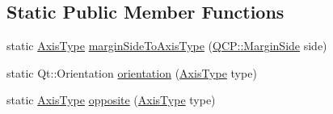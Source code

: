 \subsection*{Static Public Member Functions}
\begin{DoxyCompactItemize}
\item 
static \mbox{\hyperlink{class_q_c_p_axis_ae2bcc1728b382f10f064612b368bc18a}{Axis\+Type}} \mbox{\hyperlink{class_q_c_p_axis_ac0a6b77bd52bec6c81cd62d167cfeba6}{margin\+Side\+To\+Axis\+Type}} (\mbox{\hyperlink{namespace_q_c_p_a7e487e3e2ccb62ab7771065bab7cae54}{Q\+C\+P\+::\+Margin\+Side}} side)
\item 
static Qt\+::\+Orientation \mbox{\hyperlink{class_q_c_p_axis_a9a68b3e45f1b1e33d4d807822342516c}{orientation}} (\mbox{\hyperlink{class_q_c_p_axis_ae2bcc1728b382f10f064612b368bc18a}{Axis\+Type}} type)
\item 
static \mbox{\hyperlink{class_q_c_p_axis_ae2bcc1728b382f10f064612b368bc18a}{Axis\+Type}} \mbox{\hyperlink{class_q_c_p_axis_aa85ba73dfee6483e23825461b725e363}{opposite}} (\mbox{\hyperlink{class_q_c_p_axis_ae2bcc1728b382f10f064612b368bc18a}{Axis\+Type}} type)
\end{DoxyCompactItemize}
